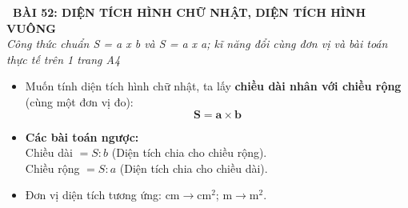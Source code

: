 \documentclass[11pt,a4paper]{article}
\begin{document}
\begin{tcolorbox}[
  enhanced,
  colback=white,
  colframe=primary,
  arc=3mm,
  boxrule=1.2pt,
  left=4mm, right=4mm, top=2.5mm, bottom=2.5mm,
  drop shadow=black!10!white
]
  \centering
  {\Large\bfseries\color{primary}\faBookmark\ BÀI 52: DIỆN TÍCH HÌNH CHỮ NHẬT, DIỆN TÍCH HÌNH VUÔNG}\\[1.5mm]
  {\small\itshape\color{black!75}Công thức chuẩn S = a x b và S = a x a; kĩ năng đổi cùng đơn vị và bài toán thực tế trên 1 trang A4}
\end{tcolorbox}

\vspace{-2mm}


\noindent
\begin{minipage}[t]{0.49\textwidth}\vspace{0pt}
\begin{tcolorbox}[
  enhanced,
  colback=blue!4!white,
  colframe=blue!75!black,
  arc=2mm, boxrule=0.8pt,
  left=2mm, right=2mm, top=1.8mm, bottom=1.8mm,
  title={\footnotesize\bfseries\color{white}\faKey\ 1. Diện tích hình chữ nhật}
]
{\footnotesize
\begin{itemize}\setlength{\itemsep}{1.5pt}\setlength{\leftskip}{-2.5mm}
  \item Muốn tính diện tích hình chữ nhật, ta lấy \textbf{chiều dài nhân với chiều rộng} (cùng một đơn vị đo):
  $$\mathbf{S = a \times b}$$
  \item \textbf{Các bài toán ngược:}\\
  Chiều dài $= S : b$ (Diện tích chia cho chiều rộng).\\
  Chiều rộng $= S : a$ (Diện tích chia cho chiều dài).
  \item Đơn vị diện tích tương ứng: $\text{cm} \to \text{cm}^2$; $\text{m} \to \text{m}^2$.
\end{itemize}
}
\end{tcolorbox}
\end{minipage}
\hfill
\end{document}
